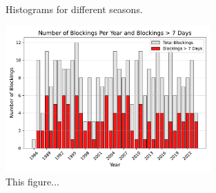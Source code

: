\begin{figure}[H]
    \caption{Histograms for different seasons.}
    \label{fig:histograms}
\end{figure}

\begin{figure}[H]
    \centering    \includegraphics[width=0.7\textwidth]{Figures/BlockingsPerYear.pdf}
    \caption{This figure...}
    \label{fig:BlockingsPerYear}
\end{figure}